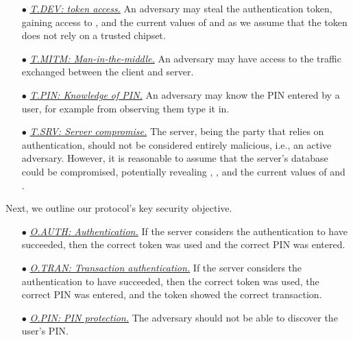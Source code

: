 \begin{itemize}[leftmargin=5.2mm]
\item[$\bullet$]\underline{\textit{T.DEV: token access.}} An adversary may steal the authentication token,  gaining access to , \VC{\salt} and the current values of \VC{\counter} and \VC{\state} as we assume that the token does not rely on a trusted chipset. 


\item[$\bullet$]\underline{\textit{T.MITM: Man-in-the-middle.}} An adversary may have access to the traffic exchanged between the client and server.

\item[$\bullet$]\underline{\textit{T.PIN: Knowledge of PIN.}} An adversary may know the PIN entered by a user, for example from observing them type it in.

\item[$\bullet$]\underline{\textit{T.SRV: Server compromise.}}  The server, being the party that relies on authentication, should not be considered entirely malicious, i.e., an active adversary. However, it is reasonable to assume that the server's database could be compromised, potentially revealing , \VS{\verifier}, and the current values of \VC{\counter} and \VC{\state}.


\end{itemize}



Next, we outline our protocol's key security objective.

\begin{itemize}[leftmargin=5.2mm]
\item[$\bullet$]\underline{\textit{O.AUTH: Authentication.}} If the server considers the authentication to have succeeded,  then the correct token was used and the correct PIN was entered.

\item[$\bullet$]\underline{\textit{O.TRAN: Transaction authentication.}} If the server considers the authentication to have succeeded, then the correct token was used, the correct PIN was entered, and the token showed the correct transaction.

\item[$\bullet$]\underline{\textit{O.PIN: PIN protection.}} The adversary should not be able to discover the user's PIN. 
\end{itemize}


